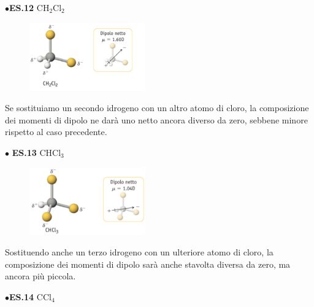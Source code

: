 \vspace{0.2cm}$\bullet$\textbf{ES.12} CH$_2$Cl$_2$

\hspace{0.5cm}\begin{minipage}{0.2\textwidth}
\begin{figure}[H]
\includegraphics[width=5cm]{immagini/CH_2Cl_2.png}
\end{figure}
\end{minipage} \hfill
\begin{minipage}{0.5\textwidth}
Se sostituiamo un secondo idrogeno con un altro atomo di cloro, la composizione dei momenti di dipolo ne darà uno netto ancora diverso da zero, sebbene minore rispetto al caso precedente.
\end{minipage}

\vspace{0.2cm}$\bullet$ \textbf{ES.13} CHCl$_3$

\hspace{0.5cm}\begin{minipage}{0.2\textwidth}
\begin{figure}[H]
\includegraphics[width=5cm]{immagini/CHCl_3.png}
\end{figure}
\end{minipage} \hfill
\begin{minipage}{0.5\textwidth}
Sostituendo anche un terzo idrogeno con un ulteriore atomo di cloro, la composizione dei momenti di dipolo sarà anche stavolta diversa da zero, ma ancora più piccola.
\end{minipage}

\vspace{0.2cm}$\bullet$\textbf{ES.14} CCl$_4$

